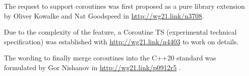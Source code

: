 The request to support coroutines was first proposed as a pure library extension by Oliver Kowalke and Nat Goodspeed in \url{http://wg21.link/n3708}.

Due to the complexity of the feature, a Coroutine TS (experimental technical specification) was established with \url{http://wg21.link/n4403} to work on details.

The wording to finally merge coroutines into the C++20 standard was formulated by Gor Nishanov in \url{http://wg21.link/p0912r5} .